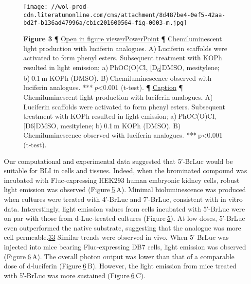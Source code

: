 \begin{figure}
\centering
\texttt{[image: //wol-prod-cdn.literatumonline.com/cms/attachment/8d487be4-0ef5-42aa-bd2f-b136ad47996a/cbic201600564-fig-0003-m.jpg]}
\caption{\textbf{Figure 3} ¶ \protect\hyperlink{}{Open in figure
viewer}\href{/action/downloadFigures?id=cbic201600564-fig-0003\&doi=10.1002\%2Fcbic.201600564}{PowerPoint}
¶ Chemiluminescent light production with luciferin analogues.
A) Luciferin scaffolds were activated to form phenyl esters. Subsequent
treatment with KOPh resulted in light emission; a) PhOC(O)Cl,
{[}D\textsubscript{6}{]}DMSO, mesitylene; b) 0.1 {m} KOPh (DMSO).
B) Chemiluminescence observed with luciferin analogues.
*** \emph{p}\textless{}0.001 (t‐test). ¶
\protect\hyperlink{}{{Caption}\emph{}} ¶ Chemiluminescent light
production with luciferin analogues. A) Luciferin scaffolds were
activated to form phenyl esters. Subsequent treatment with KOPh resulted
in light emission; a) PhOC(O)Cl, {[}D6{]}DMSO, mesitylene; b) 0.1 m KOPh
(DMSO). B) Chemiluminescence observed with luciferin analogues.
*** p\textless{}0.001 (t‐test).}
\end{figure}

Our computational and experimental data suggested that 5′‐BrLuc would be
suitable for BLI in cells and tissues. Indeed, when the brominated
compound was incubated with Fluc‐expressing HEK293 human embryonic
kidney cells, robust light emission was observed
(Figure \protect\hyperlink{cbic201600564-fig-0004}{5} A). Minimal
bioluminescence was produced when cultures were treated with 4′‐BrLuc
and 7′‐BrLuc, consistent with in vitro data. Interestingly, light
emission values from cells incubated with 5′‐BrLuc were on par with
those from {d}‐Luc‐treated cultures
(Figure \protect\hyperlink{cbic201600564-fig-0004}{5}). At low doses,
5′‐BrLuc even outperformed the native substrate, suggesting that the
analogue was more cell
permeable.{\protect\hyperlink{cbic201600564-bib-0033}{33}} Similar
trends were observed in vivo. When 5′‐BrLuc was injected into mice
bearing Fluc‐expressing DB7 cells, light emission was observed
(Figure \protect\hyperlink{cbic201600564-fig-0005}{6} A). The overall
photon output was lower than that of a comparable dose of {d}‐luciferin
(Figure \protect\hyperlink{cbic201600564-fig-0005}{6} B). However, the
light emission from mice treated with 5′‐BrLuc was more sustained
(Figure \protect\hyperlink{cbic201600564-fig-0005}{6} C).

